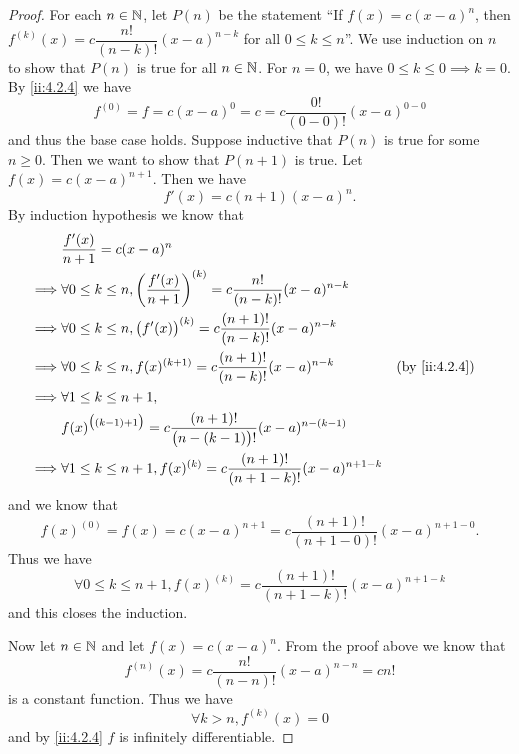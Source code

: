 \begin{proof}
  For each \(n \in \mathbb{N}\), let \(P(n)\) be the statement ``If \(f(x) = c (x - a)^n\), then \(f^{(k)}(x) = c \dfrac{n!}{(n - k)!} (x - a)^{n - k}\) for all \(0 \leq k \leq n\)''.
  We use induction on \(n\) to show that \(P(n)\) is true for all \(n \in \mathbb{N}\).
  For \(n = 0\), we have \(0 \leq k \leq 0 \implies k = 0\).
  By \cref{ii:4.2.4} we have
  \[
    f^{(0)} = f = c (x - a)^0 = c = c \dfrac{0!}{(0 - 0)!} (x - a)^{0 - 0}
  \]
  and thus the base case holds.
  Suppose inductive that \(P(n)\) is true for some \(n \geq 0\).
  Then we want to show that \(P(n + 1)\) is true.
  Let \(f(x) = c (x - a)^{n + 1}\).
  Then we have
  \[
    f'(x) = c (n + 1) (x - a)^n.
  \]
  By induction hypothesis we know that
  \begin{align*}
             & \dfrac{f'(x)}{n + 1} = c (x - a)^n                                                                                          \\
    \implies & \forall 0 \leq k \leq n, \bigg(\dfrac{f'(x)}{n + 1}\bigg)^{(k)} = c \dfrac{n!}{(n - k)!} (x - a)^{n - k}                    \\
    \implies & \forall 0 \leq k \leq n, \big(f'(x)\big)^{(k)} = c \dfrac{(n + 1)!}{(n - k)!} (x - a)^{n - k}                               \\
    \implies & \forall 0 \leq k \leq n, f(x)^{(k + 1)} = c \dfrac{(n + 1)!}{(n - k)!} (x - a)^{n - k}                   &  & \by{ii:4.2.4} \\
    \implies & \forall 1 \leq k \leq n + 1,                                                                                                \\
             & f(x)^{\big((k - 1) + 1\big)} = c \dfrac{(n + 1)!}{\big(n - (k - 1)\big)!} (x - a)^{n - (k - 1)}                             \\
    \implies & \forall 1 \leq k \leq n + 1, f(x)^{(k)} = c \dfrac{(n + 1)!}{(n + 1 - k)!} (x - a)^{n + 1 - k}
  \end{align*}
  and we know that
  \[
    f(x)^{(0)} = f(x) = c (x - a)^{n + 1} = c \dfrac{(n + 1)!}{(n + 1 - 0)!} (x - a)^{n + 1 - 0}.
  \]
  Thus we have
  \[
    \forall 0 \leq k \leq n + 1, f(x)^{(k)} = c \dfrac{(n + 1)!}{(n + 1 - k)!} (x - a)^{n + 1 - k}
  \]
  and this closes the induction.

  Now let \(n \in \mathbb{N}\) and let \(f(x) = c (x - a)^n\).
  From the proof above we know that
  \[
    f^{(n)}(x) = c \dfrac{n!}{(n - n)!} (x - a)^{n - n} = c n!
  \]
  is a constant function.
  Thus we have
  \[
    \forall k > n, f^{(k)}(x) = 0
  \]
  and by \cref{ii:4.2.4} \(f\) is infinitely differentiable.
\end{proof}

